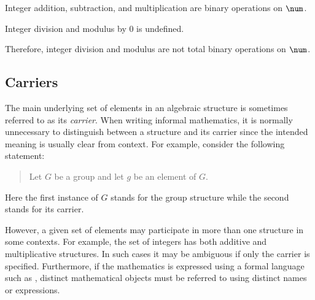 \documentclass{amsart}
\begin{document}
\begin{example}

Integer addition, subtraction, and multiplication are binary operations on $\num$.


\end{example}

\begin{counterexample}

Integer division and modulus by $0$ is undefined.


Therefore, integer division and modulus are not total binary operations on $\num$.


\end{counterexample}

\subsection{Carriers}

The main underlying set of elements in an algebraic structure is sometimes referred to as its \textit{carrier}.
When writing informal mathematics, 
it is normally unnecessary to distinguish between a structure and its carrier
since the intended meaning is usually clear from context.
For example, consider the following statement:
\begin{quote}
	Let $G$ be a group and let $g$ be an element of $G$.
\end{quote}
Here the first instance of $G$ stands for the group structure while the second stands for its carrier.

However, a given set of elements may participate in more than one structure in some contexts.
For example, the set of integers has both additive and multiplicative structures.
In such cases it may be ambiguous if only the carrier is specified.
Furthermore, if the mathematics is expressed using a formal language such as \ZN, 
distinct mathematical objects
must be referred to using distinct names or expressions.
\end{document}
